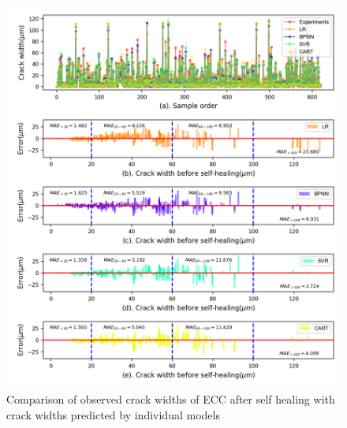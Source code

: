 \documentclass[11pt]{article}
\begin{document}
		\begin{figure}[!h]
		\centering
		\includegraphics[width=\textwidth]{m1.png}
		\caption{Comparison of observed crack widths of ECC after self healing with crack widths predicted by  individual models}
		\label{error1}
	\end{figure}
	
\end{document}
